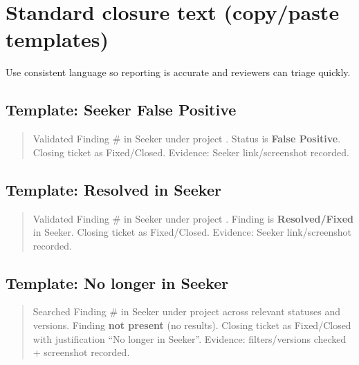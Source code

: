 \documentclass[11pt]{article}
\begin{document}
\section{Standard closure text (copy/paste templates)}
Use consistent language so reporting is accurate and reviewers can triage quickly.

\subsection*{Template: Seeker False Positive}
\begin{quote}
Validated Finding \#\underline{\hspace{2cm}} in Seeker under project \underline{\hspace{4cm}}. Status is \textbf{False Positive}. Closing ticket as Fixed/Closed. Evidence: Seeker link/screenshot recorded.
\end{quote}

\subsection*{Template: Resolved in Seeker}
\begin{quote}
Validated Finding \#\underline{\hspace{2cm}} in Seeker under project \underline{\hspace{4cm}}. Finding is \textbf{Resolved/Fixed} in Seeker. Closing ticket as Fixed/Closed. Evidence: Seeker link/screenshot recorded.
\end{quote}

\subsection*{Template: No longer in Seeker}
\begin{quote}
Searched Finding \#\underline{\hspace{2cm}} in Seeker under project \underline{\hspace{4cm}} across relevant statuses and versions. Finding \textbf{not present} (no results). Closing ticket as Fixed/Closed with justification ``No longer in Seeker''. Evidence: filters/versions checked + screenshot recorded.
\end{quote}
\end{document}

